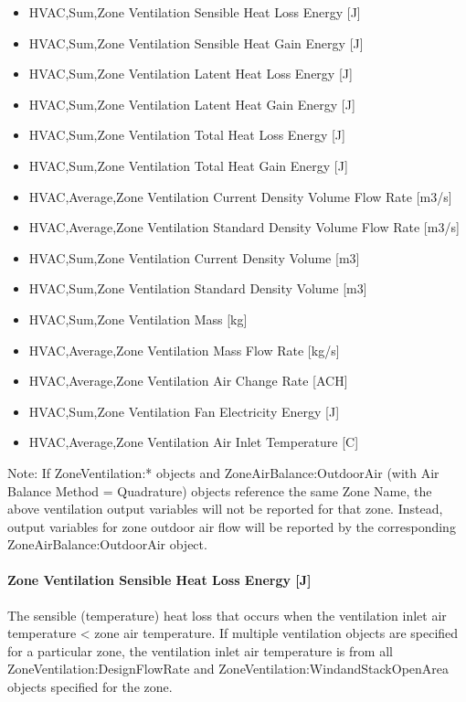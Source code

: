 \begin{itemize}
\item
  HVAC,Sum,Zone Ventilation Sensible Heat Loss Energy {[}J{]}
\item
  HVAC,Sum,Zone Ventilation Sensible Heat Gain Energy {[}J{]}
\item
  HVAC,Sum,Zone Ventilation Latent Heat Loss Energy {[}J{]}
\item
  HVAC,Sum,Zone Ventilation Latent Heat Gain Energy {[}J{]}
\item
  HVAC,Sum,Zone Ventilation Total Heat Loss Energy {[}J{]}
\item
  HVAC,Sum,Zone Ventilation Total Heat Gain Energy {[}J{]}
\item
  HVAC,Average,Zone Ventilation Current Density Volume Flow Rate {[}m3/s{]}
\item
  HVAC,Average,Zone Ventilation Standard Density Volume Flow Rate {[}m3/s{]}
\item
  HVAC,Sum,Zone Ventilation Current Density Volume {[}m3{]}
\item
  HVAC,Sum,Zone Ventilation Standard Density Volume {[}m3{]}
\item
  HVAC,Sum,Zone Ventilation Mass {[}kg{]}
\item
  HVAC,Average,Zone Ventilation Mass Flow Rate {[}kg/s{]}
\item
  HVAC,Average,Zone Ventilation Air Change Rate {[}ACH{]}
\item
  HVAC,Sum,Zone Ventilation Fan Electricity Energy {[}J{]}
\item
  HVAC,Average,Zone Ventilation Air Inlet Temperature {[}C{]}
\end{itemize}

Note: If ZoneVentilation:* objects and ZoneAirBalance:OutdoorAir (with Air Balance Method = Quadrature) objects reference the same Zone Name, the above ventilation output variables will not be reported for that zone. Instead, output variables for zone outdoor air flow will be reported by the corresponding ZoneAirBalance:OutdoorAir object.

\paragraph{Zone Ventilation Sensible Heat Loss Energy {[}J{]}}\label{zone-ventilation-sensible-heat-loss-energy-j}

The sensible (temperature) heat loss that occurs when the ventilation inlet air temperature \textless{} zone air temperature. If multiple ventilation objects are specified for a particular zone, the ventilation inlet air temperature is from all ZoneVentilation:DesignFlowRate and ZoneVentilation:WindandStackOpenArea objects specified for the zone.

